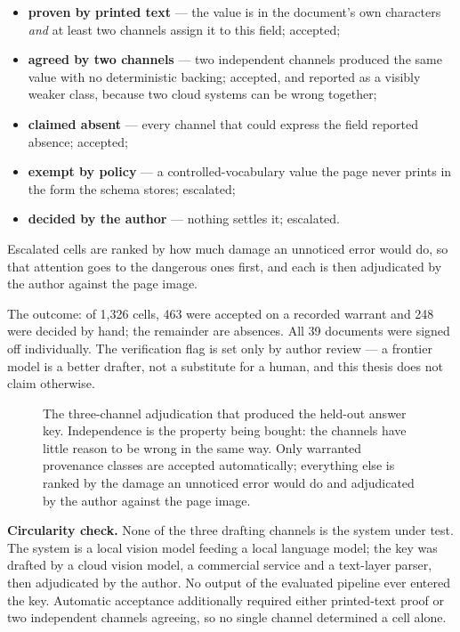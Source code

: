 \begin{itemize}
  \item \textbf{proven by printed text} --- the value is in the document's own characters
        \emph{and} at least two channels assign it to this field; accepted;
  \item \textbf{agreed by two channels} --- two independent channels produced the same value
        with no deterministic backing; accepted, and reported as a visibly weaker class,
        because two cloud systems can be wrong together;
  \item \textbf{claimed absent} --- every channel that could express the field reported
        absence; accepted;
  \item \textbf{exempt by policy} --- a controlled-vocabulary value the page never prints in
        the form the schema stores; escalated;
  \item \textbf{decided by the author} --- nothing settles it; escalated.
\end{itemize}

Escalated cells are ranked by how much damage an unnoticed error would do, so that attention
goes to the dangerous ones first, and each is then adjudicated by the author against the page
image.

The outcome: of 1{,}326 cells, 463 were accepted on a recorded warrant and 248 were decided
by hand; the remainder are absences. All 39 documents were signed off individually. The
verification flag is set only by author review --- a frontier model is a better drafter, not a
substitute for a human, and this thesis does not claim otherwise.

\begin{figure}[htbp]
  \centering
  
  \caption[The three-channel ground-truth adjudication]{The three-channel adjudication
  that produced the held-out answer key. Independence is the property being bought: the
  channels have little reason to be wrong in the same way. Only warranted provenance
  classes are accepted automatically; everything else is ranked by the damage an
  unnoticed error would do and adjudicated by the author against the page image.}
  \label{fig:gt-adjudication}
\end{figure}

\textbf{Circularity check.} None of the three drafting channels is the system under test. The
system is a local vision model feeding a local language model; the key was drafted by a cloud
vision model, a commercial service and a text-layer parser, then adjudicated by the author. No
output of the evaluated pipeline ever entered the key. Automatic acceptance additionally
required either printed-text proof or two independent channels agreeing, so no single channel
determined a cell alone.

